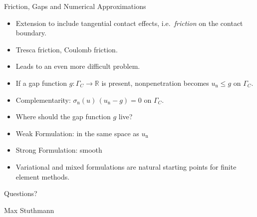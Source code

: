 \documentclass[10pt,aspectratio=169]{beamer}
\def\R{{\mathbb R}}
\begin{document}
\begin{frame}{Friction, Gaps and Numerical Approximations}
	\begin{itemize}
		\item Extension to include tangential contact effects, i.e.\ {\em friction} on the contact boundary.
		\item Tresca friction, Coulomb friction.
		\item Leads to an even more difficult problem.
		\item If a gap function $g:\Gamma_C\to\R$ is present, nonpenetration becomes $u_{\mathrm n}\le g$ on $\Gamma_C$.
		\item Complementarity: $\sigma_\mathrm{n}(u)\,(u_\mathrm{n}-g) = 0$ on $\Gamma_C$.
		\item Where should the gap function $g$ live?
		\item Weak Formulation: in the same space as $u_\mathrm{n}$
		\item Strong Formulation: smooth
		\item Variational and mixed formulations are natural starting points for finite element methods.
	\end{itemize}
\end{frame}

\begin{frame}
	\vfill
	\centering
	\setlength{\fboxsep}{0pt}
	\par
	\vspace{0.8cm}
	{\Large Questions?\par}
	\vspace{1.6em}
	{\normalsize Max Stuthmann\par}
	\vfill
\end{frame}
\end{document}
